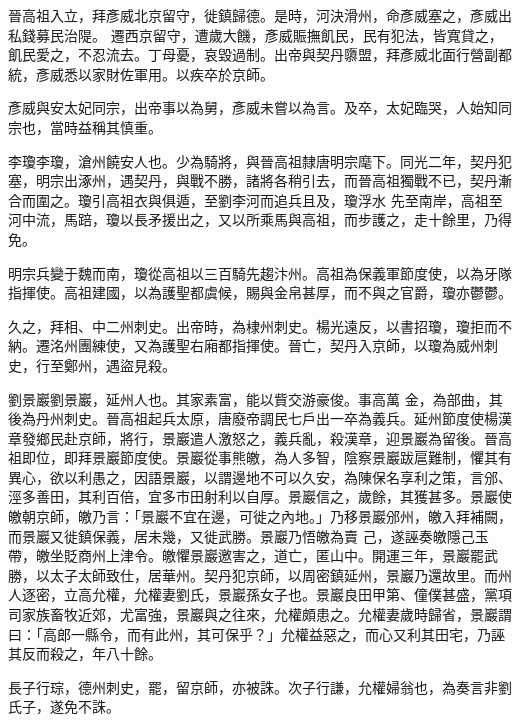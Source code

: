 \begin{pinyinscope}
 晉高祖入立，拜彥威北京留守，徙鎮歸德。是時，河決滑州，命彥威塞之，彥威出私錢募民治隄。
 遷西京留守，遭歲大饑，彥威賑撫飢民，民有犯法，皆寬貸之，飢民愛之，不忍流去。丁母憂，哀毀過制。出帝與契丹隳盟，拜彥威北面行營副都統，彥威悉以家財佐軍用。以疾卒於京師。



 彥威與安太妃同宗，出帝事以為舅，彥威未嘗以為言。及卒，太妃臨哭，人始知同宗也，當時益稱其慎重。



 李瓊李瓊，滄州饒安人也。少為騎將，與晉高祖隸唐明宗麾下。同光二年，契丹犯塞，明宗出涿州，遇契丹，與戰不勝，諸將各稍引去，而晉高祖獨戰不已，契丹漸合而圍之。瓊引高祖衣與俱遁，至劉李河而追兵且及，瓊浮水
 先至南岸，高祖至河中流，馬踣，瓊以長矛援出之，又以所乘馬與高祖，而步護之，走十餘里，乃得免。



 明宗兵變于魏而南，瓊從高祖以三百騎先趨汴州。高祖為保義軍節度使，以為牙隊指揮使。高祖建國，以為護聖都虞候，賜與金帛甚厚，而不與之官爵，瓊亦鬱鬱。



 久之，拜相、中二州刺史。出帝時，為棣州刺史。楊光遠反，以書招瓊，瓊拒而不納。遷洺州團練使，又為護聖右廂都指揮使。晉亡，契丹入京師，以瓊為威州刺史，行至鄭州，遇盜見殺。



 劉景巖劉景巖，延州人也。其家素富，能以貲交游豪俊。事高萬
 金，為部曲，其後為丹州刺史。晉高祖起兵太原，唐廢帝調民七戶出一卒為義兵。延州節度使楊漢章發鄉民赴京師，將行，景巖遣人激怒之，義兵亂，殺漢章，迎景巖為留後。晉高祖即位，即拜景巖節度使。景巖從事熊皦，為人多智，陰察景巖跋扈難制，懼其有異心，欲以利愚之，因語景巖，以謂邊地不可以久安，為陳保名享利之策，言邠、涇多善田，其利百倍，宜多市田射利以自厚。景巖信之，歲餘，其獲甚多。景巖使皦朝京師，皦乃言：「景巖不宜在邊，可徙之內地。」乃移景巖邠州，皦入拜補闕，而景巖又徙鎮保義，居未幾，又徙武勝。景巖乃悟皦為賣
 己，遂誣奏皦隱己玉帶，皦坐貶商州上津令。皦懼景巖邀害之，道亡，匿山中。開運三年，景巖罷武勝，以太子太師致仕，居華州。契丹犯京師，以周密鎮延州，景巖乃還故里。而州人逐密，立高允權，允權妻劉氏，景巖孫女子也。景巖良田甲第、僮僕甚盛，黨項司家族畜牧近郊，尤富強，景巖與之往來，允權頗患之。允權妻歲時歸省，景巖謂曰：「高郎一縣令，而有此州，其可保乎？」允權益惡之，而心又利其田宅，乃誣其反而殺之，年八十餘。



 長子行琮，德州刺史，罷，留京師，亦被誅。次子行謙，允權婦翁也，為奏言非劉氏子，遂免不誅。



\end{pinyinscope}
